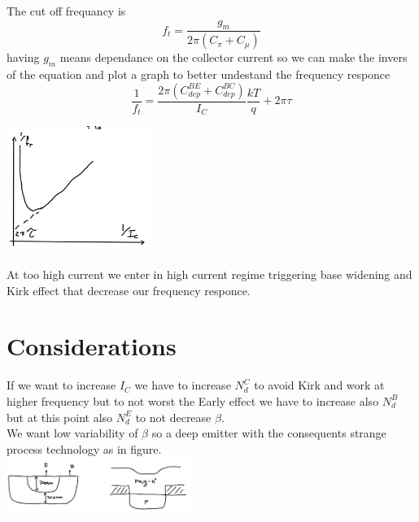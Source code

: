 The cut off frequancy is
\begin{equation}
f_t=\frac{g_m}{2\pi(C_\pi+C_\mu)}
\end{equation}
having $g_m$ means dependance on the collector current so we can make the invers of the equation and plot a graph to better undestand the frequency responce
\begin{equation}
\frac{1}{f_t}=\frac{2\pi(C_{dep}^{BE}+C_{dep}^{BC})}{I_C}\frac{kT}{q}+2\pi\tau
\end{equation}

\centering
\includegraphics[width=0.35\textwidth]{bjt14.png}\\
\raggedright

At too high current we enter in high current regime triggering base widening and Kirk effect that decrease our frequency responce.\\



\section{Considerations}

If we want to increase $I_C$ we have to increase $N_d^C$ to avoid Kirk and work at higher frequency but to not worst the Early effect we have to increase also $N_d^B$ but at this point also $N_d^E$ to not decrease $\beta$.\\
\vspace{5mm}
We want low variability of $\beta$ so a deep emitter with the consequents strange process technology as in figure.\\

\centering
\includegraphics[width=0.45\textwidth]{bjtfinal.png}\\
\raggedright

